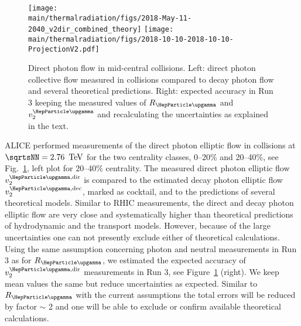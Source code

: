 \begin{figure}[htb]
\centering
\texttt{[image: \\main/thermalradiation/figs/2018-May-11-2040\_v2dir\_combined\_theory]}
\texttt{[image: \\main/thermalradiation/figs/2018-10-10-2018-10-10-ProjectionV2.pdf]}
\caption{Direct photon flow in mid-central collisions. Left: direct photon collective flow measured in \PbPb{} collisions compared to decay photon flow and several theoretical predictions. Right: expected accuracy in Run 3 keeping the  measured values of $R_{\PGg}$ and $v_{2}^{\PGg}$ and recalculating the uncertainties as explained in the text. }
\label{fig:RealPhotonsV2dir}
\end{figure}

ALICE performed measurements of the direct photon elliptic flow \cite{Acharya:2018bdy} in \PbPb{} collisions at $\sqrtsNN=\unit[2.76]{\UTeV}$ for the two centrality classes, 0--20\% and 20--40\%, see Fig.~\ref{fig:RealPhotonsV2dir}, left plot for 20--40\% centrality.
The measured direct photon elliptic flow $v_2^{\PGg,\rm dir}$ is compared to the estimated decay photon elliptic flow $v_2^{\PGg,\rm dec}$, marked as cocktail, and to the predictions of several theoretical models. Similar to RHIC measurements, the direct and decay photon elliptic flow are very close and systematically higher than theoretical predictions of hydrodynamic  \cite{Gale:2014dfa,Chatterjee:2017akg} and the transport  \cite{Linnyk:2015tha} models. However, because of the large uncertainties one can not presently exclude either of theoretical calculations. Using the same assumption concerning photon and neutral measurements in Run 3 as for $R_{\PGg}$, we estimated the expected accuracy of $v_2^{\PGg,\rm dir}$ measurements in Run 3, see Figure~\ref{fig:RealPhotonsV2dir} (right). We keep mean values the same but reduce uncertainties as expected. Similar to $R_{\PGg}$ with the current assumptions the total errors will be reduced by factor $\sim$ 2 and one will be able to exclude or confirm available theoretical calculations.





